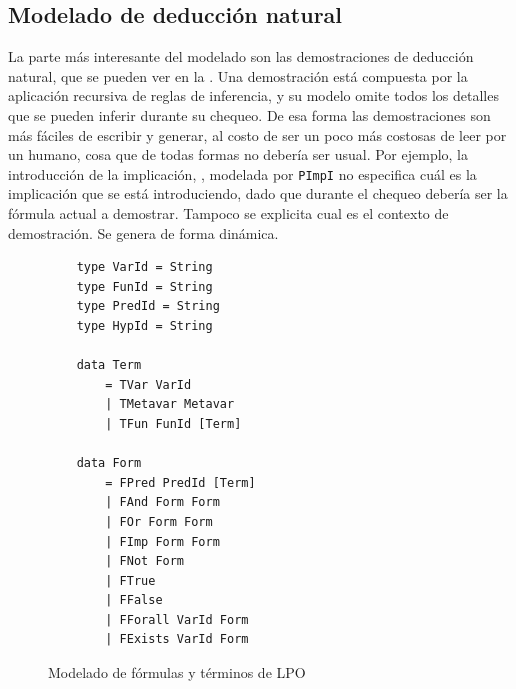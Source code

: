 \subsection{Modelado de deducción natural}
\label{ppa-tool:sec:nd}

La parte más interesante del modelado son las demostraciones de deducción
natural, que se pueden ver en la . Una
demostración está compuesta por la aplicación recursiva de reglas de inferencia,
y su modelo omite todos los detalles que se pueden inferir durante su chequeo.
De esa forma las demostraciones son más fáciles de escribir y generar, al costo
de ser un poco más costosas de leer por un humano, cosa que de todas formas no
debería ser usual. Por ejemplo, la introducción de la implicación, ,
modelada por \texttt{PImpI} no especifica cuál es la implicación que se está
introduciendo, dado que durante el chequeo debería ser la fórmula actual a
demostrar. Tampoco se explicita cual es el contexto de
demostración. Se genera de forma dinámica.

\begin{figure}[p]
    \begin{multicols}{2}
    \begin{verbatim}
    type VarId = String
    type FunId = String
    type PredId = String
    type HypId = String
    
    data Term
        = TVar VarId
        | TMetavar Metavar
        | TFun FunId [Term]
    
    data Form
        = FPred PredId [Term]
        | FAnd Form Form
        | FOr Form Form
        | FImp Form Form
        | FNot Form
        | FTrue
        | FFalse
        | FForall VarId Form
        | FExists VarId Form
    \end{verbatim}
    \end{multicols}
    \caption{Modelado de fórmulas y términos de LPO}
    \end{figure}
    

